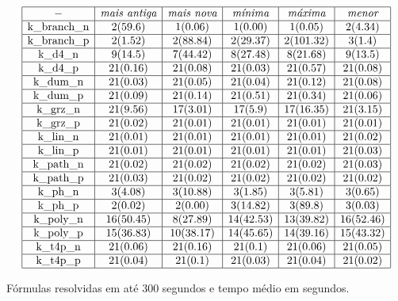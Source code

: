 \begin{table*}[t]
	\[
\begin{array}{|c|c|c|c|c|c|}
	\hline - & \textit{mais antiga} & \textit{mais nova} & \textit{mínima} & \textit{máxima} & \textit{menor} \\

	\hline \textnormal{k\_branch\_n} & 2(59.6) & 1(0.06) & 1(0.00) & 1(0.05) & 2(4.34) \\
	\hline \textnormal{k\_branch\_p} & 2(1.52) & 2(88.84) & 2(29.37)& 2(101.32) & 3(1.4) \\
	\hline \textnormal{k\_d4\_n} & 9(14.5) & 7(44.42) & 8(27.48)& 8(21.68) & 9(13.5) \\
	\hline \textnormal{k\_d4\_p} & 21(0.16) & 21(0.08) & 21(0.03) & 21(0.57) & 21(0.08) \\
	\hline \textnormal{k\_dum\_n} & 21(0.03) & 21(0.05) & 21(0.04) & 21(0.12) & 21(0.08) \\
	\hline \textnormal{k\_dum\_p} & 21(0.09) & 21(0.14) & 21(0.51) & 21(0.34) & 21(0.06) \\
	\hline \textnormal{k\_grz\_n} & 21(9.56) & 17(3.01) & 17(5.9) & 17(16.35) & 21(3.15) \\
	\hline \textnormal{k\_grz\_p} & 21(0.02) & 21(0.01) & 21(0.01) & 21(0.01) & 21(0.01) \\
	\hline \textnormal{k\_lin\_n} & 21(0.01) & 21(0.01) & 21(0.01) & 21(0.01) & 21(0.02) \\
	\hline \textnormal{k\_lin\_p} & 21(0.01) & 21(0.01) & 21(0.01) & 21(0.01) & 21(0.03) \\
	\hline \textnormal{k\_path\_n} & 21(0.02) & 21(0.02) & 21(0.02) & 21(0.02) & 21(0.03) \\
	\hline \textnormal{k\_path\_p} & 21(0.03) & 21(0.02) & 21(0.02) & 21(0.02) & 21(0.02) \\
	\hline \textnormal{k\_ph\_n} & 3(4.08) & 3(10.88) & 3(1.85) & 3(5.81) & 3(0.65) \\
	\hline \textnormal{k\_ph\_p} & 2(0.02) & 2(0.00) & 3(14.82) & 3(89.8) & 3(0.03) \\
	\hline \textnormal{k\_poly\_n} & 16(50.45) & 8(27.89) & 14(42.53) & 13(39.82) & 16(52.46) \\
	\hline \textnormal{k\_poly\_p} & 15(36.83) & 10(38.17) & 14(45.65) & 14(39.16) & 15(43.32) \\
	\hline \textnormal{k\_t4p\_n} & 21(0.06) & 21(0.16) & 21(0.1) & 21(0.06) & 21(0.05) \\
	\hline \textnormal{k\_t4p\_p} & 21(0.04) & 21(0.1) & 21(0.03) & 21(0.04) & 21(0.02) \\
	
	\hline
\end{array}
	\]
\caption{Fórmulas resolvidas em até 300 segundos e tempo médio em segundos.}
\label{table:primeiro10}
\end{table*}

